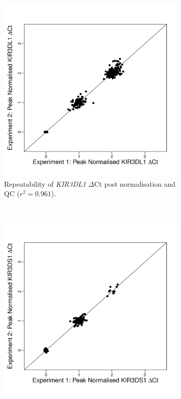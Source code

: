 \begin{figure}[h]
    \centering
    \begin{subfigure}[b]{.4\textwidth}
        \includegraphics[scale=.4] {KIR/figures/DL1-repeatability.pdf}
        \caption{Repeatability of \emph{KIR3DL1} $\Delta$Ct post normalisation and QC ($r^{2}=0.961$).}
    \end{subfigure}
    ~
    \begin{subfigure}[b]{.4\textwidth}
        \includegraphics[scale=.4] {KIR/figures/DS1-repeatability.pdf}

\end{subfigure}
\end{figure}
